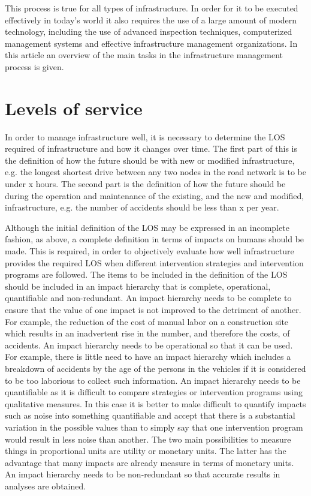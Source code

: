 This process is true for all types of infrastructure. In order for it to be executed effectively in today’s world it also requires the use of a large amount of modern technology, including the use of advanced inspection techniques, computerized management systems and effective infrastructure management organizations. In this article an overview of the main tasks in the infrastructure management process is given.

\section{Levels of service}\label{1:los}
In order to manage infrastructure well, it is necessary to determine the LOS required of infrastructure and how it changes over time. The first part of this is the definition of how the future should be with new or modified infrastructure, e.g. the longest shortest drive between any two nodes in the road network is to be under x hours. The second part is the definition of how the future should be during the operation and maintenance of the existing, and the new and modified, infrastructure, e.g. the number of accidents should be less than x per year.  

Although the initial definition of the LOS may be expressed in an incomplete fashion, as above, a complete definition in terms of impacts on humans should be made. This is required, in order to objectively evaluate how well infrastructure provides the required LOS when different intervention strategies and intervention programs are followed. The items to be included in the definition of the LOS should be included in an impact hierarchy that is complete, operational, quantifiable and non-redundant. An impact hierarchy needs to be complete to ensure that the value of one impact is not improved to the detriment of another. For example, the reduction of the cost of manual labor on a construction site which results in an inadvertent rise in the number, and therefore the costs, of accidents. An impact hierarchy needs to be operational so that it can be used. For example, there is little need to have an impact hierarchy which includes a breakdown of accidents by the age of the persons in the vehicles if it is considered to be too laborious to collect such information. An impact hierarchy needs to be quantifiable as it is difficult to compare strategies or intervention programs using qualitative measures. In this case it is better to make difficult to quantify impacts such as noise into something quantifiable and accept that there is a substantial variation in the possible values than to simply say that one intervention program would result in less noise than another. The two main possibilities to measure things in proportional units are utility or monetary units. The latter has the advantage that many impacts are already measure in terms of monetary units. An impact hierarchy needs to be non-redundant so that accurate results in analyses are obtained.

